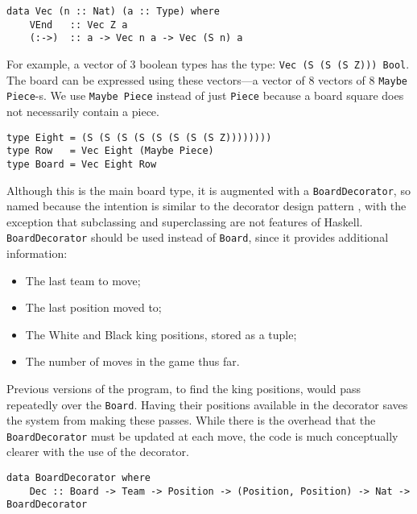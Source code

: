 \documentclass[12pt, a4paper, bibliography=totocnumbered]{scrartcl}
\begin{document}
\begin{lstlisting}
data Vec (n :: Nat) (a :: Type) where
    VEnd   :: Vec Z a
    (:->)  :: a -> Vec n a -> Vec (S n) a
\end{lstlisting}

For example, a vector of 3 boolean types has the type: \lstinline[basicstyle=\ttfamily]{Vec (S (S (S Z))) Bool}. The board can be expressed using these vectors---a vector of 8 vectors of 8 \lstinline[basicstyle=\ttfamily]{Maybe Piece}-s. We use \lstinline[basicstyle=\ttfamily]{Maybe Piece} instead of just \lstinline[basicstyle=\ttfamily]{Piece} because a board square does not necessarily contain a piece.

\begin{lstlisting}
type Eight = (S (S (S (S (S (S (S (S Z))))))))
type Row   = Vec Eight (Maybe Piece)
type Board = Vec Eight Row
\end{lstlisting}

Although this is the main board type, it is augmented with a \lstinline[basicstyle=\ttfamily]{BoardDecorator}, so named because the intention is similar to the decorator design pattern \cite{decorator}, with the exception that subclassing and superclassing are not features of Haskell. \lstinline[basicstyle=\ttfamily]{BoardDecorator} should be used instead of \lstinline[basicstyle=\ttfamily]{Board}, since it provides additional information:

\begin{itemize}
    \item The last team to move;
    \item The last position moved to;
    \item The White and Black king positions, stored as a tuple;
    \item The number of moves in the game thus far.
\end{itemize}

Previous versions of the program, to find the king positions, would pass repeatedly over the \lstinline[basicstyle=\ttfamily]{Board}. Having their positions available in the decorator saves the system from making these passes. While there is the overhead that the \lstinline[basicstyle=\ttfamily]{BoardDecorator} must be updated at each move, the code is much conceptually clearer with the use of the decorator.

\begin{lstlisting}
data BoardDecorator where
    Dec :: Board -> Team -> Position -> (Position, Position) -> Nat -> BoardDecorator
\end{lstlisting}
\end{document}
